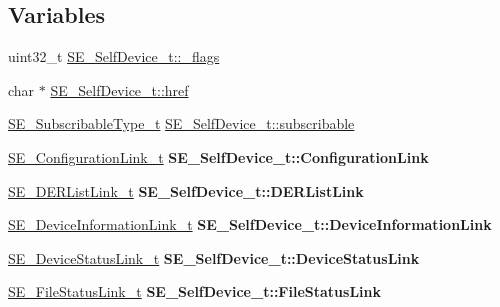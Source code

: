 \subsection*{Variables}
\begin{DoxyCompactItemize}
\item 
uint32\+\_\+t \hyperlink{group__SelfDevice_ga27f85d9e504787c2216b4e4b563acd5a}{S\+E\+\_\+\+Self\+Device\+\_\+t\+::\+\_\+flags}
\item 
char $\ast$ \hyperlink{group__SelfDevice_ga2aea57d2afcdf455280b2f24ea8ccdd4}{S\+E\+\_\+\+Self\+Device\+\_\+t\+::href}
\item 
\hyperlink{group__SubscribableType_ga5c41f553d369710ed34619266bf2551e}{S\+E\+\_\+\+Subscribable\+Type\+\_\+t} \hyperlink{group__SelfDevice_gaa48517dd0693a35578006ff2ab117c35}{S\+E\+\_\+\+Self\+Device\+\_\+t\+::subscribable}
\item 
\mbox{\label{group__SelfDevice_gafafe5a78bea0e5a176916f345e978a56}} 
\hyperlink{structSE__ConfigurationLink__t}{S\+E\+\_\+\+Configuration\+Link\+\_\+t} {\bfseries S\+E\+\_\+\+Self\+Device\+\_\+t\+::\+Configuration\+Link}
\item 
\mbox{\label{group__SelfDevice_gab10b6ae6f2c7b606c3a0206e16a5062c}} 
\hyperlink{structSE__DERListLink__t}{S\+E\+\_\+\+D\+E\+R\+List\+Link\+\_\+t} {\bfseries S\+E\+\_\+\+Self\+Device\+\_\+t\+::\+D\+E\+R\+List\+Link}
\item 
\mbox{\label{group__SelfDevice_ga76a8ec786cedb99468696384487b07f3}} 
\hyperlink{structSE__DeviceInformationLink__t}{S\+E\+\_\+\+Device\+Information\+Link\+\_\+t} {\bfseries S\+E\+\_\+\+Self\+Device\+\_\+t\+::\+Device\+Information\+Link}
\item 
\mbox{\label{group__SelfDevice_gab40cf01f7035eae939e2658a8ae56fae}} 
\hyperlink{structSE__DeviceStatusLink__t}{S\+E\+\_\+\+Device\+Status\+Link\+\_\+t} {\bfseries S\+E\+\_\+\+Self\+Device\+\_\+t\+::\+Device\+Status\+Link}
\item 
\mbox{\label{group__SelfDevice_ga2675332980db9824758f5e8c76481954}} 
\hyperlink{structSE__FileStatusLink__t}{S\+E\+\_\+\+File\+Status\+Link\+\_\+t} {\bfseries S\+E\+\_\+\+Self\+Device\+\_\+t\+::\+File\+Status\+Link}
\item 
\mbox{\label{group__SelfDevice_ga0391e69c58d65d1ba437d8ccc796aa49}} 

\end{DoxyCompactItemize}
